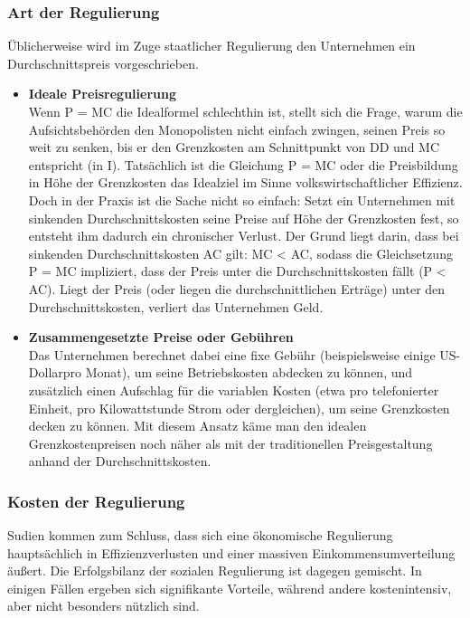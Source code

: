 \documentclass[10pt]{scrartcl}
\begin{document}
\subsubsection{Art der Regulierung}
Üblicherweise wird im Zuge staatlicher Regulierung den Unternehmen ein Durchschnittspreis vorgeschrieben.
\begin{itemize}
\item {\bf Ideale Preisregulierung}\\
Wenn P = MC die Idealformel schlechthin ist, stellt sich die Frage, warum die Aufsichtsbehörden den Monopolisten nicht einfach zwingen, seinen Preis so weit zu senken, bis er den Grenzkosten am Schnittpunkt von DD und MC entspricht (in I). Tatsächlich ist die Gleichung P = MC oder die Preisbildung in Höhe der Grenzkosten das Idealziel im Sinne volkswirtschaftlicher Effizienz. Doch in der Praxis ist die Sache nicht so einfach: Setzt ein Unternehmen mit sinkenden Durchschnittskosten seine Preise auf Höhe der Grenzkosten fest, so entsteht ihm dadurch ein chronischer Verlust. Der Grund liegt darin, dass bei sinkenden Durchschnittskosten AC gilt: MC < AC, sodass die Gleichsetzung P = MC impliziert, dass der Preis unter die Durchschnittskosten fällt (P < AC). Liegt der Preis (oder liegen die durchschnittlichen Erträge) unter den Durchschnittskosten, verliert das Unternehmen Geld. 
\item {\bf Zusammengesetzte Preise oder Gebühren}\\
Das Unternehmen berechnet dabei eine fixe Gebühr (beispielsweise einige US-Dollarpro Monat), um seine Betriebskosten abdecken zu können, und zusätzlich einen Aufschlag für die variablen Kosten (etwa pro telefonierter Einheit, pro Kilowattstunde Strom oder dergleichen), um seine Grenzkosten decken zu können. Mit diesem Ansatz käme man den idealen Grenzkostenpreisen noch näher als mit der traditionellen Preisgestaltung anhand der Durchschnittskosten.
\end{itemize}
\subsubsection{Kosten der Regulierung}
Sudien kommen zum Schluss, dass sich eine ökonomische Regulierung hauptsächlich in Effizienzverlusten und einer massiven Einkommensumverteilung äußert. Die Erfolgsbilanz der sozialen Regulierung ist dagegen gemischt. In einigen Fällen ergeben sich signifikante Vorteile, während andere kostenintensiv, aber nicht besonders nützlich sind.  
\end{document}
